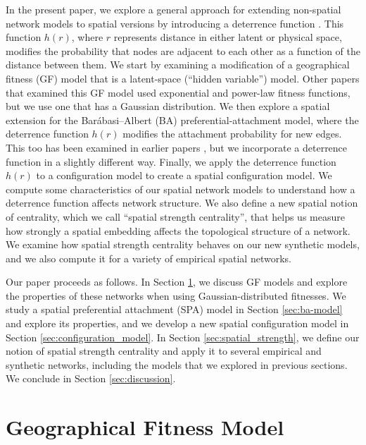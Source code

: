 \documentclass[%
 reprint,
 amsmath,amssymb,
 aps,
]{revtex4-1}
\begin{document}
In the present paper, we explore a general approach for extending non-spatial network models to spatial versions by introducing a deterrence function \cite{community2}. This function $h(r)$, where $r$ represents distance in either latent or physical space, modifies the probability that nodes are adjacent to each other as a function of the distance between them. We start by examining a modification of a geographical fitness (GF) model \cite{yusuke} that is a latent-space (``hidden variable'') model. Other papers that examined this GF model \cite{geographical_threshold, geographical_threshold2} used exponential and power-law fitness functions, but we use one that has a Gaussian distribution. We then explore a spatial extension for the Bar\'abasi--Albert (BA) preferential-attachment model, where the deterrence function $h(r)$ modifies the attachment probability for new edges. This too has been examined in earlier papers \cite{SPA1, SPA2, SPA3}, but we incorporate a deterrence function in a slightly different way. Finally, we apply the deterrence function $h(r)$ to a configuration model \cite{fosdick} to create a spatial configuration model. We compute some characteristics of our spatial network models to understand how a deterrence function affects network structure. We also define a new spatial notion of centrality, which we call ``spatial strength centrality'', that helps us measure how strongly a spatial embedding affects the topological structure of a network. We examine how spatial strength centrality behaves on our new synthetic models, and we also compute it for a variety of empirical spatial networks.

Our paper proceeds as follows. In Section \ref{sec:fitness_model}, we discuss GF models and explore the properties of these networks when using Gaussian-distributed fitnesses. We study a spatial preferential attachment (SPA) model in Section \ref{sec:ba-model} and explore its properties, and we develop a new spatial configuration model in Section \ref{sec:configuration_model}. In Section \ref{sec:spatial_strength}, we define our notion of spatial strength centrality and apply it to several empirical and synthetic networks, including the models that we explored in previous sections. We conclude in Section \ref{sec:discussion}.






\section{Geographical Fitness Model} \label{sec:fitness_model}
\end{document}
